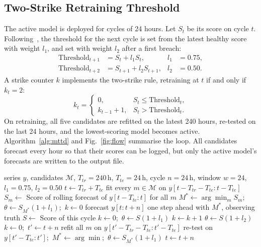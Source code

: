 \documentclass[journal,onecolumn,11pt]{IEEEtran}
\begin{document}
\subsection{Two-Strike Retraining Threshold}
The active model is deployed for cycles of 24 hours. Let $S_t$ be its score on cycle $t$. Following~\cite{nashaat2026}, the threshold for the next cycle is set from the latest healthy score with weight $l_1$, and set with weight $l_2$ after a first breach:
\begin{align}
\mathrm{Threshold}_{t+1} &= S_t + l_1 S_t, & l_1&=0.75,\\
\mathrm{Threshold}_{t+2} &= S_{t+1} + l_2 S_{t+1}, & l_2&=0.50.
\end{align}
A strike counter $k$ implements the two-strike rule, retraining at $t$ if and only if $k_t=2$:
\begin{equation}
k_t=\begin{cases}0, & S_t\le \mathrm{Threshold}_t,\\ k_{t-1}+1, & S_t>\mathrm{Threshold}_t.\end{cases}
\end{equation}
On retraining, all five candidates are refitted on the latest 240 hours, re-tested on the last 24 hours, and the lowest-scoring model becomes active. Algorithm~\ref{alg:mttd} and Fig.~\ref{fig:flow} summarise the loop. All candidates forecast every hour so that their scores can be logged, but only the active model's forecasts are written to the output file.

\begin{algorithm}[H]
\caption{Online MTTD with two-strike retraining}
\label{alg:mttd}
\small
\begin{algorithmic}[1]
\Require series $y$, candidates $\mathcal{M}$, $T_{tr}{=}240$\,h, $T_{te}{=}24$\,h, cycle $n{=}24$\,h, window $w{=}24$, $l_1{=}0.75$, $l_2{=}0.50$
\State $t\gets T_{tr}+T_{te}$ 
\State fit every $m\in\mathcal{M}$ on $y[t{-}T_{tr}{-}T_{te}:t{-}T_{te}]$ 
\State $S_m\gets$ Score of rolling forecast of $y[t{-}T_{te}:t]$ for all $m$
\State $M^*\gets\arg\min_m S_m$;\ $\theta\gets S_{M^*}(1{+}l_1)$;\ $k\gets0$ 
 
  \State forecast $y[t:t{+}n]$ one step ahead with $M^*$, observing truth
  \State $S\gets$ Score of this cycle
   \State $k\gets0$;\ $\theta\gets S(1{+}l_1)$
  \Else \State $k\gets k+1$
     \State $\theta\gets S(1{+}l_2)$
    \Else \State $k\gets0$;\ $t'\gets t+n$
      \State refit all $m$ on $y[t'{-}T_{tr}{-}T_{te}:t'{-}T_{te}]$
      \State re-test on $y[t'{-}T_{te}:t']$;\ $M^*\gets\arg\min$;\ $\theta\gets S_{M^*}(1{+}l_1)$
    \EndIf
  \EndIf
  \State $t\gets t+n$
\EndWhile
\end{algorithmic}
\end{algorithm}
\end{document}
